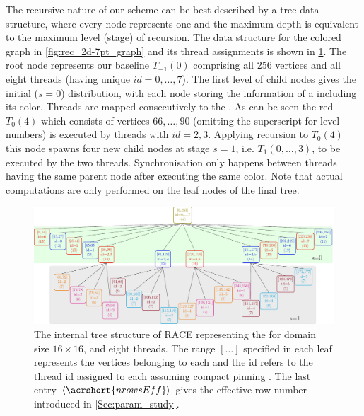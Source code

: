 The recursive nature of our scheme can be best  described by a tree data structure, where every node represents one \levelGroup and  the maximum depth is equivalent to the maximum level (stage) of recursion. The data structure for the colored graph in \cref{fig:rec_2d-7pt_graph} and its thread assignments is shown in \cref{fig:rec_2d-7pt_tree}. The root node represents our baseline \levelGroup $T_{-1}(0)$ comprising all 256 vertices and all eight threads (having unique $id=0,\ldots,7$). The first level of child nodes gives the initial ($s=0$) distribution, with each node storing the information of a \levelGroup including its color. Threads are mapped consecutively to the \levelGroups. As can be seen the red $T_0(4)$ \levelGroup which consists of vertices $66,\ldots,90$ (omitting the superscript for level numbers) is executed by threads with $id=2,3$.  Applying recursion to $T_0(4)$ this node spawns four new child nodes at stage $s =1$, i.e. \levelGroups $T_1(0,\ldots,3)$, to be executed by the two threads. Synchronisation only happens between threads having the same parent node after executing the same color. Note that actual computations are only performed on the leaf nodes of the final tree.
	 \begin{figure}[thbp]
		 \includegraphics[width=\textwidth, height=0.2\textheight]{pics/recursion/2d-7pt_example/tree/tree}
	 	\caption{The internal tree structure of \acrshort{RACE} representing the \stex for domain size $16 \times 16$, and eight threads. The range $[\ldots]$ specified in each leaf represents the vertices belonging to each \levelGroup and the id refers to the thread id assigned to each \levelGroup assuming compact pinning . The last entry $\langle\acrshort{nrowsEff}\rangle$ gives the effective row number introduced in  \cref{Sec:param_study}. }
	 	\label{fig:rec_2d-7pt_tree}
	 \end{figure}

